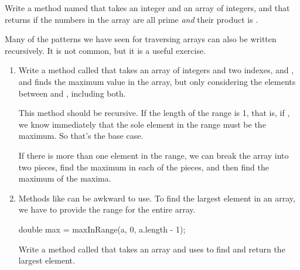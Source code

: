 \begin{exercise}
Write a method named  that takes an integer  and an array of integers, and that returns  if the numbers in the array are all prime {\it and} their product is .
\end{exercise}


\begin{exercise}
Many of the patterns we have seen for traversing arrays can also be written recursively.
It is not common, but it is a useful exercise.

\begin{enumerate}

\item Write a method called  that takes an array of integers and two indexes,  and , and finds the maximum value in the array, but only considering the elements between  and , including both.

This method should be recursive.
If the length of the range is 1, that is, if , we know immediately that the sole element in the range must be the maximum.
So that's the base case.

If there is more than one element in the range, we can break the array into two pieces, find the maximum in each of the pieces, and then find the maximum of the maxima.

\item Methods like  can be awkward to use.
To find the largest element in an array, we have to provide the range for the entire array.

\begin{code}
double max = maxInRange(a, 0, a.length - 1);
\end{code}

Write a method called  that takes an array and uses  to find and return the largest element.

\end{enumerate}
\end{exercise}



%
%
%
%
